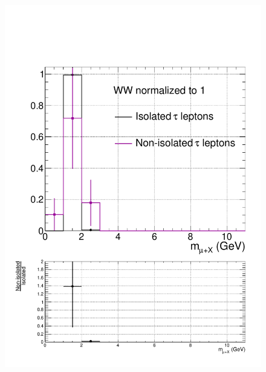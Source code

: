\begin{figure}[hbtp]
\begin{center}
    \includegraphics[width=0.6\cmsFigWidth]{figures/isoVsNonIsoTaus_WW_lowMT_v87}

\end{center}
\end{figure}
